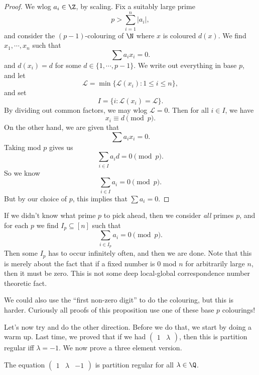 \documentclass[a4paper]{article}
\begin{document}
\begin{proof}
  We wlog $a_i \in \Z$, by scaling. Fix a suitably large prime
  \[
    p > \sum_{i = 1}^n |a_i|,
  \]
  and consider the $(p - 1)$-colouring of $\N$ where $x$ is coloured $d(x)$. We find $x_1, \cdots, x_n$ such that
  \[
    \sum a_i x_i = 0.
  \]
  and $d(x_i) = d$ for some $d \in \{1, \cdots, p - 1\}$. We write out everything in base $p$, and let
  \[
    \mathcal{L} = \min \{\mathcal{L}(x_i): 1 \leq i \leq n\},
  \]
  and set
  \[
    I = \{i: \mathcal{L}(x_i) = \mathcal{L}\}.
  \]
  By dividing out common factors, we may wlog $\mathcal{L} = 0$. Then for all $i \in I$, we have %
  \[
    x_i \equiv d \pmod p.
  \]
  On the other hand, we are given that
  \[
    \sum a_i x_i = 0.
  \]
  Taking mod $p$ gives us
  \[
    \sum_{i \in I} a_i d = 0 \pmod p.
  \]
  So we know
  \[
    \sum_{i \in I} a_i = 0 \pmod p.
  \]
  But by our choice of $p$, this implies that $\sum a_i = 0$.
\end{proof}
If we didn't know what prime $p$ to pick ahead, then we consider \emph{all} primes $p$, and for each $p$ we find $I_p \subseteq [n]$ such that
\[
  \sum_{i \in I_p} a_i = 0 \pmod p.
\]
Then some $I_p$ has to occur infinitely often, and then we are done. Note that this is merely about the fact that if a fixed number is $0$ mod $n$ for arbitrarily large $n$, then it must be zero. This is not some deep local-global correspondence number theoretic fact.

We could also use the ``first non-zero digit'' to do the colouring, but this is harder. Curiously all proofs of this proposition use one of these base $p$ colourings!

Let's now try and do the other direction. Before we do that, we start by doing a warm up. Last time, we proved that if we had $\begin{pmatrix}1 & \lambda\end{pmatrix}$, then this is partition regular iff $\lambda = -1$. We now prove a three element version.

\begin{prop}
  The equation $\begin{pmatrix}1 & \lambda & -1\end{pmatrix}$ is partition regular for all $\lambda \in \Q$.
\end{prop}
\end{document}
